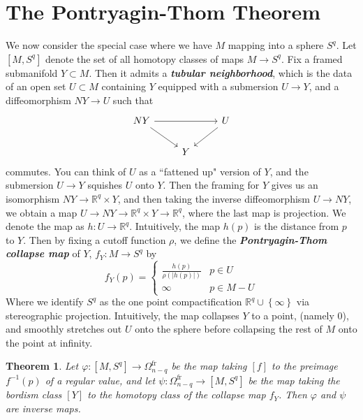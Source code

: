 \documentclass[psamsfonts]{amsart}
\newtheorem{thm}{Theorem}[section]
\theoremstyle{definition}
\theoremstyle{remark}
\newcommand{\R}{\mathbb{R}}
\newcommand{\ib}[1]{\textbf{\textit{#1}}}
\newcommand{\inv}{^{-1}}
\newcommand{\set}[1]{\left\lbrace #1 \right\rbrace}
\newcommand{\abs}[1]{\left\lvert#1\right\rvert}
\begin{document}
\section*{The Pontryagin-Thom Theorem}
%
We now consider the special case where we have $M$ mapping into a sphere $S^q$. Let $[M, S^q]$ denote the set of all homotopy classes of maps $M \to S^q$. Fix a framed submanifold $Y \subset M$. Then it admits a \ib{tubular neighborhood}, which is the data of an open set $U \subset M$ containing $Y$ equipped with a submersion $U \to Y$, and a diffeomorphism $NY \to U$ such that 
$$\begin{tikzcd} 
NY \ar[rr] \ar[dr] && U \ar[dl] \\
& Y
\end{tikzcd}$$
commutes. You can think of $U$ as a ``fattened up" version of $Y$, and the submersion $U \to Y$ squishes $U$ onto $Y$. Then the framing for $Y$ gives us an isomorphism $NY \to \R^q \times Y$, and then taking the inverse diffeomorphism $U \to NY$, we obtain a map $U \to NY \to \R^q \times Y \to \R^q$, where the last map is projection. We denote the map as $h : U \to \R^q$.  Intuitively, the map $h(p)$ is the distance from $p$ to $Y$. Then by fixing a cutoff function $\rho$, we define the \ib{Pontryagin-Thom collapse map} of $Y$, $f_Y : M \to S^q$ by
$$f_Y(p) = \begin{cases} 
\frac{h(p)}{\rho(\abs{h(p)})} & p \in U \\
\infty & p \in M - U
\end{cases}$$
Where we identify $S^q$ as the one point compactification $\R^q \cup \set{\infty}$ via stereographic projection. Intuitively, the map collapses $Y$ to a point, (namely $0$), and smoothly stretches out $U$ onto the sphere before collapsing the rest of $M$ onto the point at infinity.
%
\begin{thm}
Let $\varphi : [M,S^q] \to \Omega^{\text{fr}}_{n - q}$ be the map taking $[f]$ to the preimage $f\inv(p)$ of a regular value, and let $\psi : \Omega^{\text{fr}}_{n-q} \to [M, S^q]$ be the map taking the bordism class $[Y]$ to the homotopy class of the collapse map $f_Y$. Then $\varphi$ and $\psi$ are inverse maps.
\end{thm}
\end{document}
